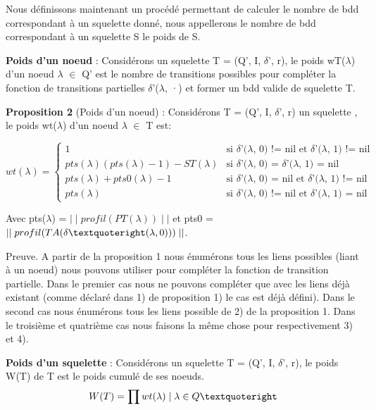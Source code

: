 \documentclass[french]{article}
\begin{document}
Nous définissons maintenant un procédé permettant de calculer le nombre de bdd correspondant à un squelette donné, nous appellerons le nombre de bdd correspondant à un squelette S le poids de S.

\textbf{Poids d'un noeud} : Considérons un squelette T = (Q’, I, \(\delta\)’, r), le poids wT(\(\lambda\)) d'un noeud \(\lambda\) \(\in\) Q’ est le nombre de transitions possibles pour compléter la fonction de transitions partielles \(\delta\)’(\(\lambda\), ·) et former un bdd valide de squelette T.

\textbf{Proposition 2} (Poids d'un noeud) : Considérons T = (Q’, I, \(\delta\)’, r) un squelette , le poids wt(\(\lambda\)) d'un noeud \(\lambda\) \(\in\) T est:

\begin{equation}
    wt(\lambda) =
    \begin{cases}
        1 & \text{si \(\delta\)’(\(\lambda\), 0) != nil et \(\delta\)’(\(\lambda\), 1) != nil}\\
        pts(\lambda) (pts(\lambda) - 1) - ST(\lambda) & \text{si \(\delta\)’(\(\lambda\), 0) = \(\delta\)’(\(\lambda\), 1) = nil}\\
        pts(\lambda) + pts0(\lambda) - 1  & \text{si \(\delta\)’(\(\lambda\), 0) = nil et \(\delta\)’(\(\lambda\), 1) != nil}\\
        pts(\lambda)   & \text{si \(\delta\)’(\(\lambda\), 0) != nil et \(\delta\)’(\(\lambda\), 1) = nil}
    \end{cases}       
\end{equation}

Avec pts(\(\lambda\)) = \(\mid\mid profil(PT(\lambda)) \mid\mid\) et pts0 = \(\mid\mid profil(TA(\delta \textquoteright(\lambda,0))) \mid\mid\).

Preuve. A partir de la proposition 1 nous énumérons tous les liens possibles (liant à un noeud) nous pouvons utiliser pour compléter la fonction de transition partielle. Dans le premier cas nous ne pouvons compléter que avec les liens déjà existant (comme déclaré dans 1) de proposition 1) le cas est déjà défini). Dans le second cas nous énumérons tous les liens possible de 2) de la proposition 1. Dans le troisième et quatrième cas nous faisons la même chose pour respectivement  3) et 4).
\vspace{5mm} 


\textbf{Poids d'un squelette} : Considérons un squelette T = (Q’, I, \(\delta\)’, r), le poids W(T) de T est le poids cumulé de ses noeuds.
\[W(T) = \prod wt(\lambda) \mid \lambda \in Q\textquoteright\]
\end{document}
